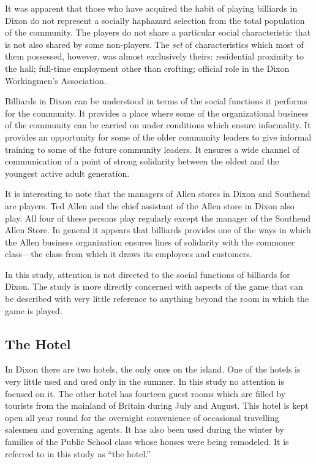 \documentclass[openany,nobib]{tufte-book}
\begin{document}
It was apparent that those who have acquired the habit of playing
billiards in Dixon do not represent a socially haphazard selection from
the total population of the community. The players do not share a
particular social characteristic that is not also shared by some
non-players. The \emph{set} of characteristics which most of them
possessed, however, was almost exclusively theirs: residential proximity
to the hall; full-time employment other than crofting; official role in
the Dixon Workingmen's Association.

Billiards in Dixon can be understood in terms of the social functions it
performs for the community. It provides a place where some of the
organizational business of the community can be carried on under
conditions which ensure informality. It provides an opportunity for some
of the older community leaders to give informal training to some of the
future community leaders. It ensures a wide channel of communication of
a point of strong solidarity between the oldest and the youngest active
adult generation.

It is interesting to note that the managers of Allen stores in Dixon and
Southend are players. Ted Allen and the chief assistant of the Allen
store in Dixon also play. All four of these persons play regularly
except the manager of the Southend Allen Store. In general it appears
that billiards provides one of the ways in which the Allen business
organization ensures lines of solidarity with the commoner class---the
class from which it draws its employees and customers.

In this study, attention is not directed to the social functions of
billiards for Dixon. The study is more directly concerned with aspects
of the game that can be described with very little reference to anything
beyond the room in which the game is played.

\hypertarget{the-hotel}{%
\subsection{The Hotel}\label{the-hotel}}

In Dixon there are two hotels, the only ones on the island. One of the
hotels is very little used and used only in the summer. In this study no
attention is focused on it. The other hotel has fourteen guest rooms
which are filled by tourists from the mainland of Britain during July
and August. This hotel is kept open all year round for the overnight
convenience of occasional travelling salesmen and governing agents. It
has also been used during the winter by families of the Public School
class whose houses were being remodeled. It is referred to in this study
as ``the hotel.''
\end{document}
